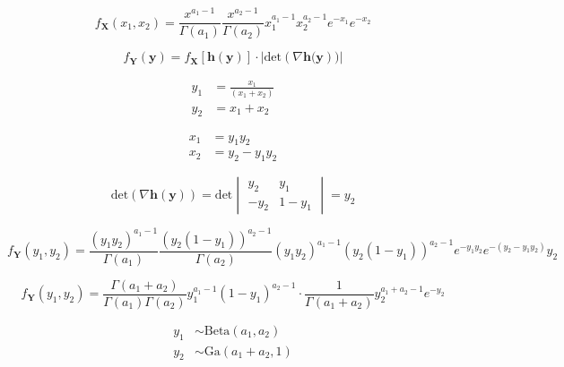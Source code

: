 \documentclass[12pt]{article}
\begin{document}
        \begin{equation}
              f_{\mathbf{X}}(x_1, x_2) = \frac{x^{a_1-1}}{\Gamma(a_1)}\frac{x^{a_2-1}}{\Gamma(a_2)}x_1^{a_1-1} x_2^{a_2-1} e^{-x_1}e^{-x_2}
        \end{equation}

        \begin{equation}
              f_{\mathbf{Y}}(\mathbf{y}) = f_{\mathbf{X}}[\mathbf{h(y)}]\cdot|\text{det}(\nabla \mathbf{h(y}))|
        \end{equation}

        \begin{align}
              y_1 &= \frac{x_1}{(x_1+x_2)} \\
              y_2 &= x_1 + x_2
        \end{align}

        \begin{align}
              x_1 &= y_1 y_2 \\
              x_2 &= y_2 - y_1 y_2
        \end{align}

        \begin{equation}
              \text{det}(\nabla \mathbf{h(y)}) = \text{det}
              \begin{vmatrix}
              y_2 & y_1 \\
              -y_2 & 1-y_1
              \end{vmatrix}
              = y_2
        \end{equation}

        \begin{equation}
              f_{\mathbf{Y}}(y_1, y_2) = \frac{(y_1 y_2)^{a_1-1}}{\Gamma(a_1)}\frac{(y_2 (1-y_1))^{a_2-1}}{\Gamma(a_2)}(y_1 y_2)^{a_1-1} (y_2 (1-y_1))^{a_2-1} e^{-y_1 y_2}e^{-(y_2 - y_1 y_2)} y_2
        \end{equation}

        \begin{equation}
              f_{\mathbf{Y}}(y_1, y_2) = \frac{\Gamma(a_1 + a_2)}{\Gamma(a_1) \Gamma(a_2)} y_1^{a_1 -1} (1-y_1)^{a_2 - 1} \cdot \frac{1}{\Gamma(a_1 + a_2)} y_2^{a_1 + a_2 -1} e^{-y_2}
        \end{equation}

        \begin{align}
              y_1 &\sim \text{Beta}(a_1, a_2)\\
              y_2 &\sim \text{Ga}(a_1 + a_2, 1)
        \end{align}
\end{document}

